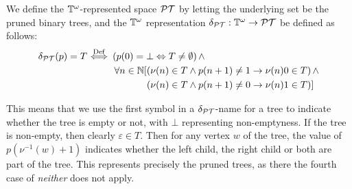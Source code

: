 \documentclass{eptcs-modified}
\begin{document}
\begin{definition}
\label{def:pruned}
We define the $\mathbb{T}^\omega$-represented space $\mathcal{PT}$ by letting the underlying set be the pruned binary trees, and the $\mathbb{T}^\omega$ representation $\delta_{\mathcal{PT}} : \mathbb{T}^\omega \to \mathcal{PT}$ be defined as follows:
\begin{align*} \delta_{\mathcal{PT}} (p) = T {
\ \stackrel{\mathrm{Def}}{\Longleftrightarrow}}
\  &\left ( p(0) = \bot \Leftrightarrow T \neq \emptyset \right ) \wedge\\
&\ \forall n \in \mathbb{N}
[ \left ( \nu(n) \in T \wedge p(n+1) \neq 1 \rightarrow \nu(n)0 \in T \right )
\wedge \\ & \hspace*{1.25cm} \left ( \nu(n) \in T \wedge p(n+1) \neq 0 \rightarrow \nu(n)1 \in T \right ) ]
 \end{align*}
\end{definition}

This means that we use the first symbol in a $\delta_{\mathcal{PT}}$-name for a tree to indicate whether the tree is empty or not, with $\bot$ representing non-emptyness. If the tree is non-empty, then clearly $\varepsilon \in T$. Then for any vertex $w$ of the tree, the value of $p(\nu^{-1}(w) +1)$ indicates whether the left child, the right child or both are part of the tree. This represents precisely the pruned trees, as there the fourth case of \emph{neither} does not apply.
\end{document}
